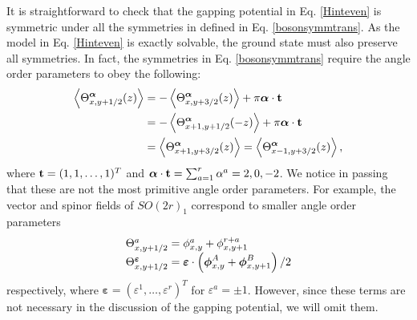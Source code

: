It is straightforward to check that the gapping potential in Eq. \eqref{Hinteven} is symmetric under all the symmetries in defined in Eq. \eqref{bosonsymmtrans}. As the model in Eq. \eqref{Hinteven} is exactly solvable, the ground state must also preserve all symmetries. In fact, the symmetries in Eq. \eqref{bosonsymmtrans} require the angle order parameters to obey the following: \begin{align}\left\langle\Theta^{\boldsymbol\alpha}_{x,y+1/2}(z)\right\rangle&=-\left\langle\Theta^{\boldsymbol\alpha}_{x,y+3/2}(z)\right\rangle+\pi\boldsymbol\alpha\cdot{\bf t}\nonumber\\&=-\left\langle\Theta^{\boldsymbol\alpha}_{x+1,y+1/2}(-z)\right\rangle+\pi\boldsymbol\alpha\cdot{\bf t}\label{evenorderparameter}\\&=\left\langle\Theta^{\boldsymbol\alpha}_{x+1,y+3/2}(z)\right\rangle=\left\langle\Theta^{\boldsymbol\alpha}_{x-1,y+3/2}(z)\right\rangle,\nonumber\end{align} where ${\bf t}=(1,1,\ldots,1)^T$ and $\boldsymbol\alpha\cdot{\bf t}=\sum_{a=1}^r\alpha^a=2,0,-2$. We notice in passing that these are not the most primitive angle order parameters. For example, the vector and spinor fields of $SO(2r)_1$ correspond to smaller angle order parameters~\cite{PhysRevB.94.165142} \begin{align}\begin{array}{*{20}l}\Theta^a_{x,y+1/2}=\phi^a_{x,y}+\phi^{r+a}_{x,y+1}\\\Theta^{\boldsymbol\varepsilon}_{x,y+1/2}=\boldsymbol\varepsilon\cdot\left(\boldsymbol\phi^A_{x,y}+\boldsymbol\phi^B_{x,y+1}\right)/2\end{array}\end{align} respectively, where $\boldsymbol\varepsilon=(\varepsilon^1,\ldots,\varepsilon^r)^T$ for $\varepsilon^a=\pm1$. However, since these terms are not necessary in the discussion of the gapping potential, we will omit them.

